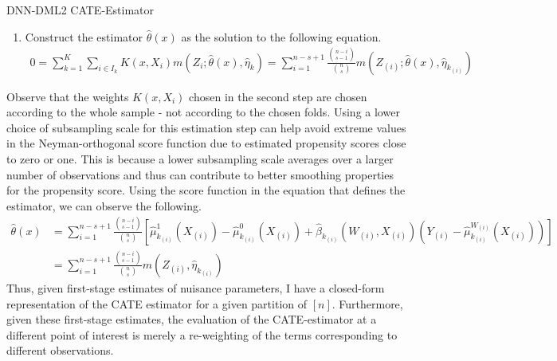 \begin{boxD}
\begin{dfn}{DNN-DML2 CATE-Estimator}
\begin{enumerate}
			\item Construct the estimator $\hat{\theta}\left(x\right)$
			      as the solution to the following equation.
			      \begin{equation}
				      \begin{aligned}
					      0 = \sum_{k = 1}^{K} \sum_{i \in I_k} K(x, X_{i}) m\left(Z_{i}; \hat{\theta}\left(x\right), \hat{\eta}_{k}\right)
					      = \sum_{i = 1}^{n - s + 1} \frac{\binom{n-i}{s-1}}{\binom{n}{s}} m\left(Z_{(i)}; \hat{\theta}\left(x\right),\hat{\eta}_{k_{(i)}}\right)
				      \end{aligned}
			      \end{equation}
		\end{enumerate}
	\end{dfn}
\end{boxD}
Observe that the weights $K(x, X_{i})$ chosen in the second step are chosen according to the whole sample - not according to the chosen folds.
Using a lower choice of subsampling scale for this estimation step can help avoid extreme values in the Neyman-orthogonal score function due to estimated propensity scores close to zero or one.
This is because a lower subsampling scale averages over a larger number of observations and thus can contribute to better smoothing properties for the propensity score.
Using the score function in the equation that defines the estimator, we can observe the following.
\begin{equation}
	\begin{aligned}
		\hat{\theta}\left(x\right) 
        & = \sum_{i = 1}^{n - s + 1} \frac{\binom{n-i}{s-1}}{\binom{n}{s}}
		\left[\hat{\mu}_{k_{(i)}}^{1}\left(X_{(i)}\right) - \hat{\mu}_{k_{(i)}}^{0}\left(X_{(i)}\right) + \hat{\beta}_{k_{(i)}}\left(W_{(i)}, X_{(i)}\right)\left(Y_{(i)} - \hat{\mu}^{W_{(i)}}_{k_{(i)}}\left(X_{(i)}\right)\right)\right] \\
        & = \sum_{i = 1}^{n - s + 1} \frac{\binom{n-i}{s-1}}{\binom{n}{s}} m(Z_{(i)}, \hat{\eta}_{k_{(i)}})
	\end{aligned}
\end{equation}
Thus, given first-stage estimates of nuisance parameters, I have a closed-form representation of the CATE estimator for a given partition of $[n]$.
Furthermore, given these first-stage estimates, the evaluation of the CATE-estimator at a different point of interest is merely a re-weighting of the terms corresponding to different observations.

